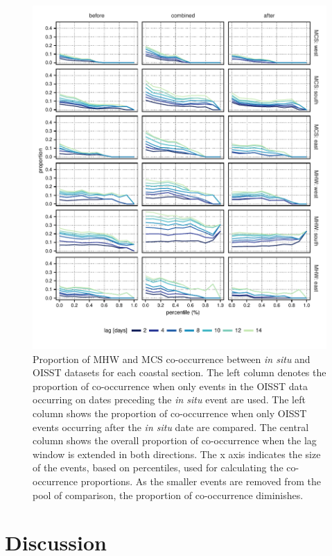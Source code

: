 \documentclass[a4paper,10pt,review]{elsarticle}
\begin{document}
\begin{figure}
\centering \includegraphics[width=1.0\textwidth]{figure5.pdf}
\caption{Proportion of MHW and MCS co-occurrence between \emph{in situ} and OISST datasets for each coastal section. The left column denotes the proportion of co-occurrence when only events in the OISST data occurring on dates preceding the \emph{in situ} event are used. The left column shows the proportion of co-occurrence when only OISST events occurring after the \emph{in situ} date are compared. The central column shows the overall proportion of co-occurrence when the lag window is extended in both directions. The x axis indicates the size of the events, based on percentiles, used for calculating the co-occurrence proportions. As the smaller events are removed from the pool of comparison, the proportion of co-occurrence diminishes.} \label{fig:Figure5}
\end{figure}

\section{Discussion}
\end{document}
